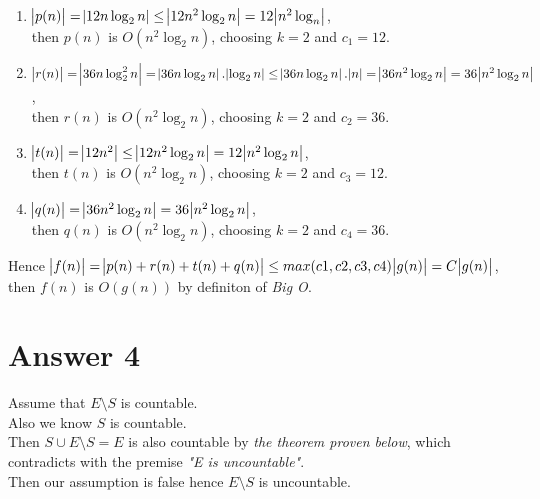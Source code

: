 \documentclass[12pt]{article}
\begin{document}
\begin{enumerate}[label=(\roman*)]
\item $\abs{p(n)}=\abs{12n\log_2n}\leq\abs{12n^2\log_2n}=12\abs{n^2\log_n}$,\\
then $p(n)$ is $O(n^2\log_2n)$, choosing $k=2$ and $c_1=12$.

\item $\abs{r(n)}=\abs{36n\log_2^{2}n}=\abs{36n\log_2n}.\abs{\log_2n}\leq\abs{36n\log_2n}.\abs{n}=\abs{36n^2\log_2n}=36\abs{n^2\log_2n}$,\\
then $r(n)$ is $O(n^2\log_2n)$, choosing $k=2$ and $c_2=36$.

\item $\abs{t(n)}=\abs{12n^2}\leq\abs{12n^2\log_2n}=12\abs{n^2\log_2n}$,\\
then $t(n)$ is $O(n^2\log_2n)$, choosing $k=2$ and $c_3=12$.

\item $\abs{q(n)}=\abs{36n^2\log_2n}=36\abs{n^2\log_2n}$,\\
then $q(n)$ is $O(n^2\log_2n)$, choosing $k=2$ and $c_4=36$.

\end{enumerate}

Hence $\abs{f(n)}=\abs{p(n)+r(n)+t(n)+q(n)}\leq max(c1,c2,c3,c4)\abs{g(n)}=C\abs{g(n)}$, then $f(n)$ is $O(g(n))$ by definiton of \textit{Big O}.

\section*{Answer 4}

Assume that $E\setminus S$ is countable.\\
Also we know $S$ is countable.\\
Then $S\cup E\setminus S=E$ is also countable by \textit{the theorem proven below}, which contradicts with the premise \textit{"E is uncountable"}.\\
 Then our assumption is false hence $E\setminus S$ is uncountable.
\end{document}
